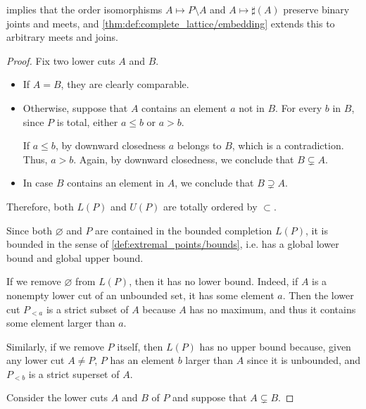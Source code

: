 \begin{comments}
  \item {} implies that the order isomorphisms \( A \mapsto P \setminus A \) and \( A \mapsto \sharp(A) \) preserve binary joints and meets, and \cref{thm:def:complete_lattice/embedding} extends this to arbitrary meets and joins.
\end{comments}
\begin{proof}
   Fix two lower cuts \( A \) and \( B \).

  \begin{itemize}
    \item If \( A = B \), they are clearly comparable.
    \item Otherwise, suppose that \( A \) contains an element \( a \) not in \( B \). For every \( b \) in \( B \), since \( P \) is total, either \( a \leq b \) or \( a > b \).

    If \( a \leq b \), by downward closedness \( a \) belongs to \( B \), which is a contradiction. Thus, \( a > b \). Again, by downward closedness, we conclude that \( B \subsetneq A \).

    \item In case \( B \) contains an element in \( A \), we conclude that \( B \supsetneq A \).
  \end{itemize}

  Therefore, both \( L(P) \) and \( U(P) \) are totally ordered by \( {\subset} \).

   Since both \( \varnothing \) and \( P \) are contained in the bounded completion \( L(P) \), it is bounded in the sense of \cref{def:extremal_points/bounds}, i.e. has a global lower bound and global upper bound.

  If we remove \( \varnothing \) from \( L(P) \), then it has no lower bound. Indeed, if \( A \) is a nonempty lower cut of an unbounded set, it has some element \( a \). Then the lower cut \( P_{<a} \) is a strict subset of \( A \) because \( A \) has no maximum, and thus it contains some element larger than \( a \).

  Similarly, if we remove \( P \) itself, then \( L(P) \) has no upper bound because, given any lower cut \( A \neq P \), \( P \) has an element \( b \) larger than \( A \) since it is unbounded, and \( P_{<b} \) is a strict superset of \( A \).

   Consider the lower cuts \( A \) and \( B \) of \( P \) and suppose that \( A \subsetneq B \).


\end{proof}
